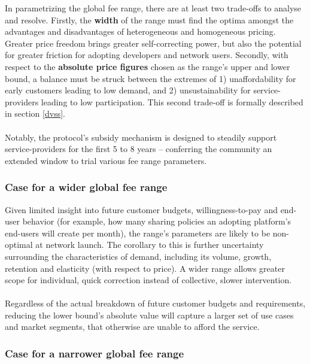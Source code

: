 \documentclass[longbibliography,nofootinbib]{revtex4-1}
\begin{document}
In parametrizing the global fee range, there are at least two trade-offs to analyse and resolve. Firstly, the \textbf{width} of the range must find the optima amongst the advantages and disadvantages of heterogeneous and homogeneous pricing. Greater price freedom brings greater self-correcting power, but also the potential for greater friction for adopting developers and network users. Secondly, with respect to the \textbf{absolute price figures} chosen as the range's upper and lower bound, a balance must be struck between the extremes of 1) unaffordability for early customers leading to low demand, and 2) unsustainability for service-providers leading to low participation. This second trade-off is formally described in section \ref{dvss}. 
\\\\
Notably, the protocol's subsidy mechanism is designed to steadily support service-providers for the first 5 to 8 years – conferring the community an extended window to trial various fee range parameters.

\subsubsection{Case for a wider global fee range}

Given limited insight into future customer budgets, willingness-to-pay and end-user behavior (for example, how many sharing policies an adopting platform's end-users will create per month), the range's parameters are likely to be non-optimal at network launch. The corollary to this is further uncertainty surrounding the characteristics of demand, including its volume, growth, retention and elasticity (with respect to price). A wider range allows greater scope for individual, quick correction instead of collective, slower intervention.
\\\\
Regardless of the actual breakdown of future customer budgets and requirements, reducing the lower bound’s absolute value will capture a larger set of use cases and market segments, that otherwise are unable to afford the service. 

\subsubsection{Case for a narrower global fee range}
\end{document}
